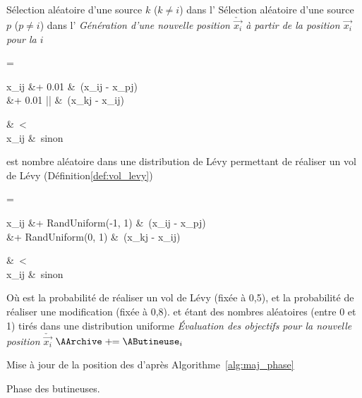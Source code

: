 \begin{algorithm}\label{alg:employed_phase}
  \SetAlgoVlined
  \DontPrintSemicolon
  {
    Sélection aléatoire d’une source $k$ ($k \neq i$) dans l’\AArchive\;
    Sélection aléatoire d’une source $p$ ($p \neq i$) dans l’\AHive\;
    \BlankLine
     \emph{Génération d’une nouvelle position $\check{\vec{x_{i}}}$ à partir de la %
                       position $\vec{x_{i}}$ pour la \AButineuse $i$}\;
    \If{$\ATirageA < \ARatio $ }
      {
      {
      \begin{algomathdisplay}
         =%
          \begin{cases}
            \begin{aligned}
              x_{ij}  &+ 0.01 \times  \ALevy  &\times \ (x_{ij} - x_{pj})  \\
                      &+ 0.01 \times |\ALevy| &\times \ (x_{kj} - x_{ij})  \\
            \end{aligned} &\ \ATirageB < \AMR \\
            x_{ij}        &\ sinon
          \end{cases}
      \end{algomathdisplay}
      \ALevy est nombre aléatoire dans une distribution de Lévy
      permettant de réaliser un vol de Lévy (Définition\ref{def:vol_levy})\;
      }
      }
    \Else
      {
      {
      \begin{algomathdisplay}
         =%
          \begin{cases}
            \begin{aligned}
              x_{ij}  &+ RandUniform(-1, 1)   &\times \ (x_{ij} - x_{pj})  \\
                      &+ RandUniform(0, 1)    &\times \ (x_{kj} - x_{ij})  \\
            \end{aligned} &\ \ATirageB < \AMR \\
            x_{ij}        &\ sinon
          \end{cases}
      \end{algomathdisplay}
      }
      }
      Où \ARatio est la probabilité de réaliser un vol de Lévy (fixée à 0,5), et \AMR la probabilité
      de réaliser une modification (fixée à 0,8). \ATirageA et \ATirageB étant des nombres aléatoires
      (entre 0 et 1) tirés dans une distribution uniforme\;
      \BlankLine
     \emph{Évaluation des objectifs pour la nouvelle position $\check{\vec{x_{i}}}$}\;
    {
      $\AArchive \pluseq \AButineuse_{i}$\;
    }
  }
  Mise à jour de la position des \ASources d’après Algorithme~\ref{alg:maj_phase}\;
  \caption{Phase des butineuses.}
\end{algorithm}
\FloatBarrier


